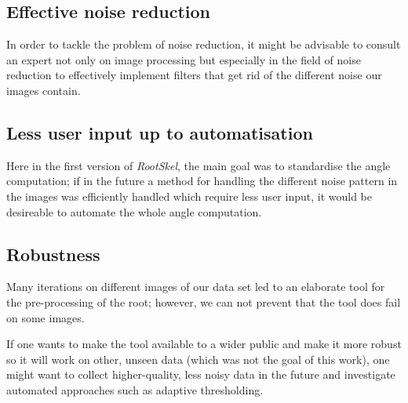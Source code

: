 \subsection{Effective noise reduction}

In order to tackle the problem of noise reduction, it might be advisable to consult an expert not only on image processing but especially in the field of noise reduction to effectively implement filters that get rid of the different noise our images contain. 



\subsection{Less user input up to automatisation}

Here in the first version of \textit{RootSkel}, the main goal was to standardise the angle computation; if in the future  a method for handling the different noise pattern in the images was efficiently handled which require less user input, it would be desireable to automate the whole angle computation.

 
 
\subsection{Robustness}



Many iterations on different images of our data set led to an elaborate tool for the pre-processing of the root; however, we can not prevent that the tool does fail on some images. 

If one wants to make the tool available to a wider public and make it more robust so it will work on other, unseen data (which was not the goal of this work), one might want to collect higher-quality, less noisy data in the future and investigate automated approaches such as adaptive thresholding. 


